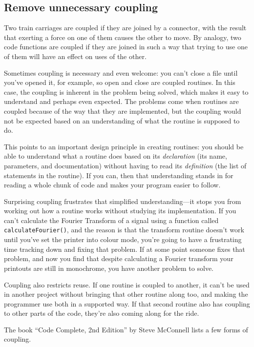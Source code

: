 \documentclass[a4paper]{article}
\begin{document}
\subsection {Remove unnecessary coupling}

Two train carriages are coupled if they are joined by a connector, with the result that exerting a force on one of them causes the other to move. By analogy, two code functions are coupled if they are joined in such a way that trying to use one of them will have an effect on uses of the other.

Sometimes coupling is necessary and even welcome: you can't close a file until you've opened it, for example, so open and close are coupled routines. In this case, the coupling is inherent in the problem being solved, which makes it easy to understand and perhaps even expected. The problems come when routines are coupled because of the way that they are implemented, but the coupling would not be expected based on an understanding of what the routine is supposed to do.

This points to an important design principle in creating routines: you should be able to understand what a routine does based on its \textit{declaration} (its name, parameters, and documentation) without having to read its \textit{definition} (the list of statements in the routine). If you can, then that understanding stands in for reading a whole chunk of code and makes your program easier to follow.

Surprising coupling frustrates that simplified understanding---it stops you from working out how a routine works without studying its implementation. If you can't calculate the Fourier Transform of a signal using a function called \texttt{calculateFourier()}, and the reason is that the transform routine doesn't work until you've set the printer into colour mode, you're going to have a frustrating time tracking down and fixing that problem. If at some point someone fixes that problem, and now you find that despite calculating a Fourier transform your printouts are still in monochrome, you have another problem to solve.

Coupling also restricts reuse. If one routine is coupled to another, it can't be used in another project without bringing that other routine along too, and making the programmer use both in a supported way. If that second routine also has coupling to other parts of the code, they're also coming along for the ride.

The book ``Code Complete, 2nd Edition'' by Steve McConnell\cite{cc2e} lists a few forms of coupling.
\end{document}
